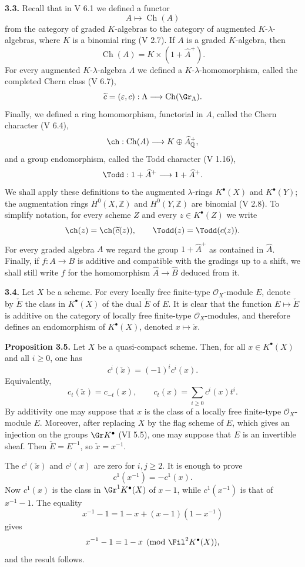 \textbf{3.3.} Recall that in V 6.1 we defined a functor
\[
A\longmapsto \operatorname{Ch}(A)
\]
from the category of graded $K$-algebras to the category of augmented $K$-$\lambda$-algebras, where $K$ is a binomial ring (V 2.7). If $A$ is a graded $K$-algebra, then
\[
\operatorname{Ch}(A)=K\times(1+\widehat A^+).
\]
For every augmented $K$-$\lambda$-algebra $\Lambda$ we defined a $K$-$\lambda$-homomorphism, called the completed Chern class (V 6.7),
\[
\widetilde c=(\varepsilon,c):\Lambda\longrightarrow\operatorname{Ch}(\Gr_{\Lambda}).
\]
Finally, we defined a ring homomorphism, functorial in $A$, called the Chern character (V 6.4),
\[
\ch:\operatorname{Ch}(A)\longrightarrow K\oplus\widehat A^+_{\mathbb Q},
\]
and a group endomorphism, called the Todd character (V 1.16),
\[
\Todd:1+\widehat A^+\longrightarrow 1+\widehat A^+.
\]
We shall apply these definitions to the augmented $\lambda$-rings $K^{\bullet}(X)$ and $K^{\bullet}(Y)$; the augmentation rings $H^0(X,\mathbb Z)$ and $H^0(Y,\mathbb Z)$ are binomial (V 2.8). To simplify notation, for every scheme $Z$ and every $z\in K^{\bullet}(Z)$ we write
\[
\ch(z)=\ch(\widetilde c(z)),
\qquad
\Todd(z)=\Todd(c(z)).
\]
For every graded algebra $A$ we regard the group $1+\widehat A^+$ as contained in $\widehat A$. Finally, if $f:A\to B$ is additive and compatible with the gradings up to a shift, we shall still write $f$ for the homomorphism $\widehat A\to\widehat B$ deduced from it.

\textbf{3.4.} Let $X$ be a scheme. For every locally free finite-type $\mathcal O_X$-module $E$, denote by $\check E$ the class in $K^{\bullet}(X)$ of the dual $\check E$ of $E$. It is clear that the function $E\mapsto\check E$ is additive on the category of locally free finite-type $\mathcal O_X$-modules, and therefore defines an endomorphism of $K^{\bullet}(X)$, denoted $x\mapsto\check x$.

\textbf{Proposition 3.5.} Let $X$ be a quasi-compact scheme. Then, for all $x\in K^{\bullet}(X)$ and all $i\geq0$, one has
\[
c^i(\check x)=(-1)^i c^i(x).
\]
Equivalently,
\[
c_t(\check x)=c_{-t}(x),
\qquad
c_t(x)=\sum_{i\geq0}c^i(x)t^i.
\]
By additivity one may suppose that $x$ is the class of a locally free finite-type $\mathcal O_X$-module $E$. Moreover, after replacing $X$ by the flag scheme of $E$, which gives an injection on the groups $\Gr K^{\bullet}$ (VI 5.5), one may suppose that $E$ is an invertible sheaf. Then $\check E=E^{-1}$, so $\check x=x^{-1}$.

The $c^i(\check x)$ and $c^j(x)$ are zero for $i,j\geq2$. It is enough to prove
\[
c^1(x^{-1})=-c^1(x).
\]
Now $c^1(x)$ is the class in $\Gr^1K^{\bullet}(X)$ of $x-1$, while $c^1(x^{-1})$ is that of $x^{-1}-1$. The equality
\[
x^{-1}-1=1-x+(x-1)(1-x^{-1})
\]
gives
\[
x^{-1}-1=1-x\pmod{\Fil^2K^{\bullet}(X)},
\]
and the result follows.

